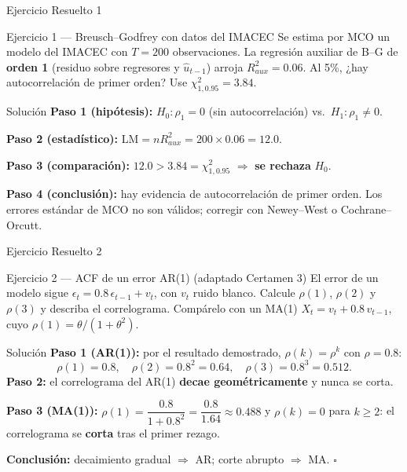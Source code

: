 \documentclass{beamer}
\begin{document}
\begin{frame}{Ejercicio Resuelto 1}

\begin{block}{Ejercicio 1 --- Breusch--Godfrey con datos del IMACEC}
Se estima por MCO un modelo del IMACEC con $T=200$ observaciones. La regresión auxiliar de B--G de \textbf{orden 1} (residuo sobre regresores y $\hat u_{t-1}$) arroja $R^2_{aux}=0.06$. Al 5\%, ¿hay autocorrelación de primer orden? Use $\chi^2_{1,0.95}=3.84$.
\end{block}

\pause

\begin{exampleblock}{Solución}
\textbf{Paso 1 (hipótesis):} $H_0:\rho_1=0$ (sin autocorrelación) vs.\ $H_1:\rho_1\neq0$.

\textbf{Paso 2 (estadístico):} $\text{LM}=nR^2_{aux}=200\times0.06=12.0$.

\textbf{Paso 3 (comparación):} $12.0 > 3.84=\chi^2_{1,0.95}$ $\Rightarrow$ \textbf{se rechaza} $H_0$.

\textbf{Paso 4 (conclusión):} hay evidencia de autocorrelación de primer orden. Los errores estándar de MCO no son válidos; corregir con Newey--West o Cochrane--Orcutt.
\end{exampleblock}

\end{frame}

\begin{frame}{Ejercicio Resuelto 2}

\begin{block}{Ejercicio 2 --- ACF de un error AR(1) (adaptado Certamen 3)}
El error de un modelo sigue $\epsilon_t=0.8\,\epsilon_{t-1}+v_t$, con $v_t$ ruido blanco. Calcule $\rho(1)$, $\rho(2)$ y $\rho(3)$ y describa el correlograma. Compárelo con un MA(1) $X_t=v_t+0.8\,v_{t-1}$, cuyo $\rho(1)=\theta/(1+\theta^2)$.
\end{block}

\pause

\begin{exampleblock}{Solución}
\textbf{Paso 1 (AR(1)):} por el resultado demostrado, $\rho(k)=\rho^k$ con $\rho=0.8$:
\[
\rho(1)=0.8,\quad \rho(2)=0.8^2=0.64,\quad \rho(3)=0.8^3=0.512.
\]
\textbf{Paso 2:} el correlograma del AR(1) \textbf{decae geométricamente} y nunca se corta.

\textbf{Paso 3 (MA(1)):} $\rho(1)=\dfrac{0.8}{1+0.8^2}=\dfrac{0.8}{1.64}\approx0.488$ y $\rho(k)=0$ para $k\ge2$: el correlograma se \textbf{corta} tras el primer rezago.

\textbf{Conclusión:} decaimiento gradual $\Rightarrow$ AR; corte abrupto $\Rightarrow$ MA. \hfill $\square$
\end{exampleblock}

\end{frame}
\end{document}
